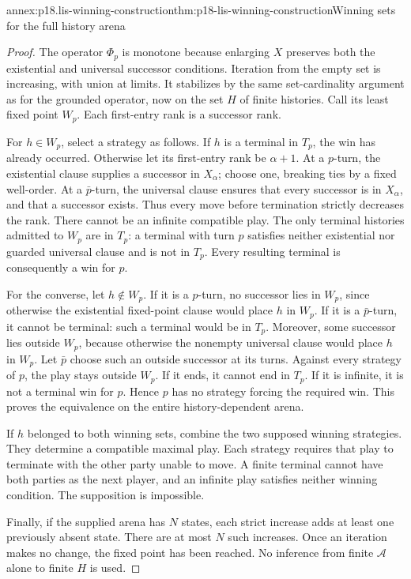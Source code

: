\begin{annexitem}{annex:p18.lis-winning-construction}{thm:p18-lis-winning-construction}{Winning sets for the full history arena}
\begin{proof}
The operator \(\Phi_p\) is monotone because enlarging \(X\)
preserves both the existential and universal successor conditions.
Iteration from the empty set is increasing, with union at limits.
It stabilizes by the same set-cardinality argument as for the
grounded operator, now on the set \(H\) of finite histories.
Call its least fixed point \(W_p\).
Each first-entry rank is a successor rank.

For \(h\in W_p\), select a strategy as follows.
If \(h\) is a terminal in \(T_p\), the win has already occurred.
Otherwise let its first-entry rank be \(\alpha+1\).
At a \(p\)-turn, the existential clause supplies a successor
in \(X_\alpha\); choose one, breaking ties by a fixed well-order.
At a \(\bar p\)-turn, the universal clause ensures that every
successor is in \(X_\alpha\), and that a successor exists.
Thus every move before termination strictly decreases the rank.
There cannot be an infinite compatible play. The only terminal
histories admitted to \(W_p\) are in \(T_p\): a terminal with
turn \(p\) satisfies neither existential nor guarded universal
clause and is not in \(T_p\).
Every resulting terminal is consequently a win for \(p\).

For the converse, let \(h\notin W_p\).
If it is a \(p\)-turn, no successor lies in \(W_p\), since otherwise
the existential fixed-point clause would place \(h\) in \(W_p\).
If it is a \(\bar p\)-turn, it cannot be terminal:
such a terminal would be in \(T_p\).
Moreover, some successor lies outside \(W_p\), because otherwise
the nonempty universal clause would place \(h\) in \(W_p\).
Let \(\bar p\) choose such an outside successor at its turns.
Against every strategy of \(p\), the play stays outside \(W_p\).
If it ends, it cannot end in \(T_p\).
If it is infinite, it is not a terminal win for \(p\).
Hence \(p\) has no strategy forcing the required win.
This proves the equivalence on the entire history-dependent arena.

If \(h\) belonged to both winning sets, combine the two supposed
winning strategies. They determine a compatible maximal play.
Each strategy requires that play to terminate with the other
party unable to move. A finite terminal cannot have both parties
as the next player, and an infinite play satisfies neither winning
condition. The supposition is impossible.

Finally, if the supplied arena has \(N\) states, each strict
increase adds at least one previously absent state. There are
at most \(N\) such increases. Once an iteration makes no change,
the fixed point has been reached. No inference from finite
\(\mathcal A\) alone to finite \(H\) is used.
\end{proof}
\end{annexitem}

